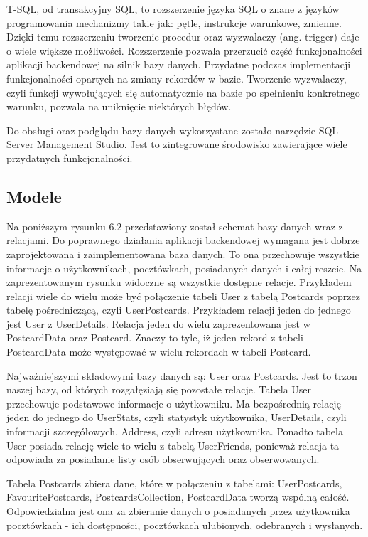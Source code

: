 \documentclass[a4paper,twoside,12pt]{book}
\begin{document}
T-SQL, od transakcyjny SQL, to rozszerzenie języka SQL o znane z języków programowania mechanizmy takie jak: pętle, instrukcje warunkowe, zmienne. Dzięki temu rozszerzeniu tworzenie procedur oraz wyzwalaczy (ang. trigger) daje o wiele większe możliwości. Rozszerzenie pozwala przerzucić część funkcjonalności aplikacji backendowej na silnik bazy danych. Przydatne podczas implementacji funkcjonalności opartych na zmiany rekordów w bazie. Tworzenie wyzwalaczy, czyli funkcji wywołujących się automatycznie na bazie po spełnieniu konkretnego warunku, pozwala na uniknięcie niektórych błędów.

Do obsługi oraz podglądu bazy danych wykorzystane zostało narzędzie SQL Server Management Studio. Jest to zintegrowane środowisko zawierające wiele przydatnych funkcjonalności. 

\subsection{Modele}
Na poniższym rysunku 6.2 przedstawiony został schemat bazy danych wraz z relacjami. Do poprawnego działania aplikacji backendowej wymagana jest dobrze zaprojektowana i zaimplementowana baza danych. To ona przechowuje wszystkie informacje o użytkownikach, pocztówkach, posiadanych danych i całej reszcie. Na zaprezentowanym rysunku widoczne są wszystkie dostępne relacje. Przykładem relacji wiele do wielu może być połączenie tabeli User z tabelą Postcards poprzez tabelę pośredniczącą, czyli UserPostcards. Przykładem relacji jeden do jednego jest User z UserDetails. Relacja jeden do wielu zaprezentowana jest w PostcardData oraz Postcard. Znaczy to tyle, iż jeden rekord z tabeli PostcardData może występować w wielu rekordach w tabeli Postcard.

Najważniejszymi składowymi bazy danych są: User oraz Postcards. Jest to trzon naszej bazy, od których rozgałęziają się pozostałe relacje. Tabela User przechowuje podstawowe informacje o użytkowniku. Ma bezpośrednią relację jeden do jednego do UserStats, czyli statystyk użytkownika, UserDetails, czyli informacji szczegółowych, Address, czyli adresu użytkownika. Ponadto tabela User posiada relację wiele to wielu z tabelą UserFriends, ponieważ relacja ta odpowiada za posiadanie listy osób obserwujących oraz obserwowanych.

Tabela Postcards zbiera dane, które w połączeniu z tabelami: UserPostcards, FavouritePostcards, PostcardsCollection, PostcardData tworzą wspólną całość. Odpowiedzialna jest ona za zbieranie danych o posiadanych przez użytkownika pocztówkach - ich dostępności, pocztówkach ulubionych, odebranych i wysłanych.
\end{document}
